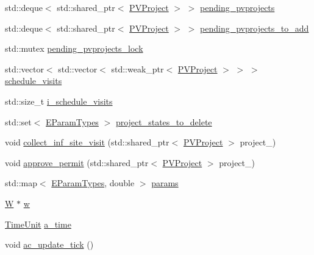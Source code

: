 \begin{DoxyCompactItemize}
\item 
std\+::deque$<$ std\+::shared\+\_\+ptr$<$ \hyperlink{classsolar__core_1_1_p_v_project}{P\+V\+Project} $>$ $>$ \hyperlink{classsolar__core_1_1_g_a3a87f9e5c14cd5bae4be8a4da538181e}{pending\+\_\+pvprojects}
\item 
std\+::deque$<$ std\+::shared\+\_\+ptr$<$ \hyperlink{classsolar__core_1_1_p_v_project}{P\+V\+Project} $>$ $>$ \hyperlink{classsolar__core_1_1_g_a053a3d2c00c5af66925ebe359c4b4228}{pending\+\_\+pvprojects\+\_\+to\+\_\+add}
\item 
std\+::mutex \hyperlink{classsolar__core_1_1_g_a7ae124e062dbd50b0da66f34c9633965}{pending\+\_\+pvprojects\+\_\+lock}
\item 
std\+::vector$<$ std\+::vector$<$ std\+::weak\+\_\+ptr$<$ \hyperlink{classsolar__core_1_1_p_v_project}{P\+V\+Project} $>$ $>$ $>$ \hyperlink{classsolar__core_1_1_g_a33472d3b331a303ec8a9b61e2da163d3}{schedule\+\_\+visits}
\item 
std\+::size\+\_\+t \hyperlink{classsolar__core_1_1_g_a5c79440fcadc7d3e9212c5e7c05f84f7}{i\+\_\+schedule\+\_\+visits}
\item 
std\+::set$<$ \hyperlink{namespacesolar__core_aa1147341e5ef7a40d68d1bd68e149362}{E\+Param\+Types} $>$ \hyperlink{classsolar__core_1_1_g_a26b220870264c1927d282dfe9412725e}{project\+\_\+states\+\_\+to\+\_\+delete}
\item 
void \hyperlink{classsolar__core_1_1_g_aecc948919b4cadba36d15b458eb0b7c3}{collect\+\_\+inf\+\_\+site\+\_\+visit} (std\+::shared\+\_\+ptr$<$ \hyperlink{classsolar__core_1_1_p_v_project}{P\+V\+Project} $>$ project\+\_\+)
\item 
void \hyperlink{classsolar__core_1_1_g_af7498122edc4bfda69724fbd1d59c53d}{approve\+\_\+permit} (std\+::shared\+\_\+ptr$<$ \hyperlink{classsolar__core_1_1_p_v_project}{P\+V\+Project} $>$ project\+\_\+)
\end{DoxyCompactItemize}
\begin{DoxyCompactItemize}
\item 
std\+::map$<$ \hyperlink{namespacesolar__core_aa1147341e5ef7a40d68d1bd68e149362}{E\+Param\+Types}, double $>$ \hyperlink{classsolar__core_1_1_g_a045f1db40b15301ed5ec8aefb5327b0e}{params}
\item 
\hyperlink{classsolar__core_1_1_w}{W} $\ast$ \hyperlink{classsolar__core_1_1_g_a7239d05d617261f97c46b641a0229c14}{w}
\item 
\hyperlink{namespacesolar__core_a4b5949d07259da6f8a20d12a30403e90}{Time\+Unit} \hyperlink{classsolar__core_1_1_g_a4d5b2845fc790c0f14b13fe922821f4b}{a\+\_\+time}
\item 
void \hyperlink{classsolar__core_1_1_g_ae01d6ea43c397cc79356884c98caf277}{ac\+\_\+update\+\_\+tick} ()
\end{DoxyCompactItemize}


